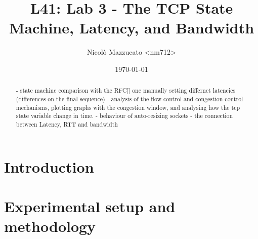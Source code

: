 \documentclass[a4paper,10pt]{article}
\begin{document}
\title{L41: Lab 3 - The TCP State Machine, Latency, and Bandwidth}
\author{Nicolò Mazzucato \textless{}nm712\textgreater{}}
\date{\today}

\maketitle

\thispagestyle{empty}

\begin{abstract}           

   - state machine comparison with the RFC[] one manually setting differnet latencies (differences on the final sequence)
   - analysis of the flow-control and congestion control mechanisms, plotting graphs with the congestion window, and analysing how the tcp state variable change in time.
   - behaviour of auto-resizing sockets
   - the connection between Latency, RTT and bandwidth


\end{abstract}

\clearpage

\setcounter{page}{1}

\section{Introduction}


\section{Experimental setup and methodology}
\end{document}
